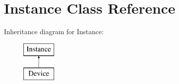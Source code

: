 \hypertarget{class_open_chams_1_1_instance}{}\section{Instance Class Reference}
\label{class_open_chams_1_1_instance}
Inheritance diagram for Instance\+:\begin{figure}[H]
\begin{center}
\leavevmode
\includegraphics[height=2.000000cm]{class_open_chams_1_1_instance}
\end{center}
\end{figure}
